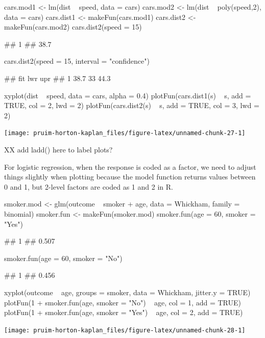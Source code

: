 \begin{Schunk}
\begin{Sinput}
cars.mod1 <- lm(dist ~ speed, data = cars)
cars.mod2 <- lm(dist ~ poly(speed,2), data = cars)
cars.dist1 <- makeFun(cars.mod1)
cars.dist2 <- makeFun(cars.mod2)
cars.dist2(speed = 15)
\end{Sinput}
\begin{Soutput}
##    1 
## 38.7
\end{Soutput}
\begin{Sinput}
cars.dist2(speed = 15, interval = "confidence")
\end{Sinput}
\begin{Soutput}
##    fit lwr  upr
## 1 38.7  33 44.3
\end{Soutput}
\begin{Sinput}
xyplot(dist ~ speed, data = cars, alpha = 0.4)
plotFun(cars.dist1(s) ~ s, add = TRUE, col = 2, lwd = 2)
plotFun(cars.dist2(s) ~ s, add = TRUE, col = 3, lwd = 2)
\end{Sinput}


\begin{center}\texttt{[image: pruim-horton-kaplan\_files/figure-latex/unnamed-chunk-27-1]} \end{center}

\end{Schunk}

XX add ladd() here to label plots?

\noindent
For logistic regression, when the response is coded as a factor, we need
to adjust things slightly when plotting because the model function
returns values between 0 and 1, but 2-level factors are coded as 1 and 2
in R.

\begin{Schunk}
\begin{Sinput}
smoker.mod <- glm(outcome ~ smoker + age, data = Whickham, family = binomial)
smoker.fun <- makeFun(smoker.mod)
smoker.fun(age = 60, smoker = "Yes")
\end{Sinput}
\begin{Soutput}
##     1 
## 0.507
\end{Soutput}
\begin{Sinput}
smoker.fun(age = 60, smoker = "No")
\end{Sinput}
\begin{Soutput}
##     1 
## 0.456
\end{Soutput}
\begin{Sinput}
xyplot(outcome ~ age, groups = smoker, data = Whickham, jitter.y = TRUE)
plotFun(1 + smoker.fun(age, smoker = "No") ~ age, col = 1, add = TRUE)
plotFun(1 + smoker.fun(age, smoker = "Yes") ~ age, col = 2, add = TRUE)
\end{Sinput}


\begin{center}\texttt{[image: pruim-horton-kaplan\_files/figure-latex/unnamed-chunk-28-1]} \end{center}

\end{Schunk}

